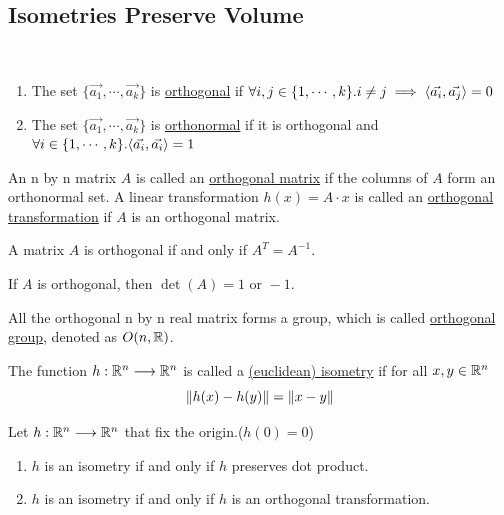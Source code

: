 \subsection{Isometries Preserve Volume}

\begin{definition}\
    \begin{enumerate}
        \item The set $\{\vec{a_1},\cdots,\vec{a_k}\}$ is \underline{orthogonal} if $\forall i,j\in\{1,\cdots,k\}.i\neq j\implies \langle \vec{a_i}, \vec{a_j} \rangle=0$
        \item The set $\{\vec{a_1},\cdots,\vec{a_k}\}$ is \underline{orthonormal} if it is orthogonal and $\forall i\in\{1,\cdots,k\}.\langle \vec{a_i}, \vec{a_i} \rangle=1$
    \end{enumerate}
\end{definition}

\begin{definition}
    An n by n matrix $A$ is called an \underline{orthogonal matrix} if the columns of $A$ form an orthonormal set. A linear transformation $h(x)=A\cdot x$ is called an \underline{orthogonal transformation} if $A$ is an orthogonal matrix.
\end{definition}

\begin{theorem}
    A matrix $A$ is orthogonal if and only if $A^T=A^{-1}$.
\end{theorem}

\begin{corollary}
    If $A$ is orthogonal, then $\det(A)=1\text{ or }-1$.
\end{corollary}

\begin{theorem*}
    All the orthogonal n by n real matrix forms a group, which is called \underline{orthogonal group}, denoted as $O(n,\mathbb{R})$.
\end{theorem*}

\begin{definition}
    The function $h:\mathbb{R}^n\longrightarrow\mathbb{R}^n$ is called a \underline{(euclidean) isometry} if for all $x,y\in\mathbb{R}^n$
    $$\left\lVert h(x)-h(y) \right\rVert=\left\lVert x-y \right\rVert$$
\end{definition}

\begin{theorem}
    Let $h:\mathbb{R}^n\longrightarrow\mathbb{R}^n$ that fix the origin.($h(0)=0$)
    \begin{enumerate}
        \item $h$ is an isometry if and only if $h$ preserves dot product.
        \item $h$ is an isometry if and only if $h$ is an orthogonal transformation.
    \end{enumerate}
\end{theorem}

